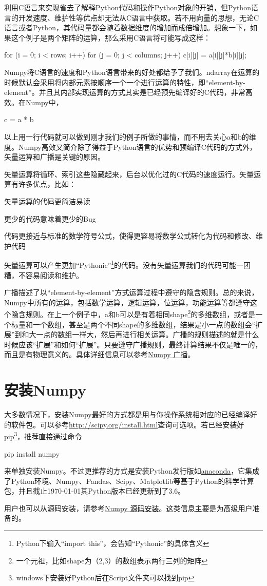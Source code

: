 利用C语言来实现省去了解释Python代码和操作Python对象的开销，但Python语言的开发速度、维护性等优点却无法从C语言中获取。若不用向量的思想，无论C语言或者Python，其代码量都会随着数据维度的增加而成倍增加。想象一下，如果这个例子是两个矩阵的运算，那么采用C语言将可能写成这样：
\begin{python}
for (i = 0; i < rows; i++) {
	for (j = 0; j < columns; j++) {
	c[i][j] = a[i][j]*b[i][j];
	}
}
\end{python}

Numpy将C语言的速度和Python语言带来的好处都给予了我们。ndarray在运算的时候默认会采用将内部元素按顺序一个一个进行运算的特性，即“element-by-element”。并且其内部实现运算的方式其实是已经预先编译好的C代码，非常高效。在Numpy中，
\begin{python}
c = a * b
\end{python}

以上用一行代码就可以做到刚才我们的例子所做的事情，而不用去关心a和b的维度。Numpy高效又简介除了得益于Python语言的优势和预编译C代码的方式外，矢量运算和广播是关键的原因。

矢量运算将循环、索引这些隐藏起来，后台以优化过的C代码的速度运行。矢量运算有许多优点，比如：
\begin{compactitem}
	\item 矢量运算的代码更简洁易读
	\item 更少的代码意味着更少的Bug
	\item 代码更接近与标准的数学符号公式，使得更容易将数学公式转化为代码和修改、维护代码
	\item 矢量运算可以产生更加“Pythonic”\footnote{Python下输入“import this”，会告知“Pythonic”的具体含义}的代码。没有矢量运算我们的代码可能一团糟，不容易阅读和维护。
\end{compactitem}

广播描述了以“element-by-element”方式运算过程中遵守的隐含规则。总的来说，Numpy中所有的运算，包括数学运算，逻辑运算，位运算，功能运算等都遵守这个隐含规则。在上一个例子中，a和b可以是有着相同shape\footnote{一个元祖，比如shape为（2,3）的数组表示两行三列的矩阵}的多维数组，或者是一个标量和一个数组，甚至是两个不同shape的多维数组，结果是小一点的数组会“扩展”到和大一点的数组一样大，然后再进行相关运算。广播的规则描述的就是什么时候应该“扩展”和如何“扩展”。只要遵守广播规则，最终计算结果不仅是唯一的，而且是有物理意义的。具体详细信息可以参考\hyperref[sec:broadcasting]{Numpy 广播}。
\section{安装Numpy}
大多数情况下，安装Numpy最好的方式都是用与你操作系统相对应的已经编译好的软件包。可以参考\url{http://scipy.org/install.html}查询可选项。若已经安装好pip\footnote{windows下安装好Python后在Script文件夹可以找到pip}，推荐直接通过命令
\begin{python}
pip install numpy
\end{python}
来单独安装Numpy。不过更推荐的方式是安装Python发行版如\href{https://www.anaconda.com/download/}{anaconda}，它集成了Python环境、Numpy、Pandas、Scipy、Matplotlib等基于Python的科学计算包，并且截止\today 其Python版本已经更新到了3.6。

用户也可以从源码安装，请参考\hyperref[sec:broadcasting]{Numpy 源码安装}。这类信息主要是为高级用户准备的。

